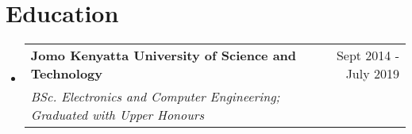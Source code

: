 \documentclass[letterpaper,11pt]{article}
\makeatletter
\newcommand{\resumeSubheading}[4]{
  \vspace{-1pt}\item
    \begin{tabular*}{0.97\textwidth}{l@{\extracolsep{\fill}}r}
      \textbf{#1} & #2 \\
      \textit{\small#3} & \textit{\small #4} \\
    \end{tabular*}\vspace{-5pt}
}
\newcommand{\resumeSubHeadingListStart}{\begin{itemize}[leftmargin=*]}
\newcommand{\resumeSubHeadingListEnd}{\end{itemize}}
\makeatother
\begin{document}
\section{Education}
  \resumeSubHeadingListStart
    \resumeSubheading
      {Jomo Kenyatta University of Science and Technology}{Sept 2014 - July 2019}
      {BSc. Electronics and Computer Engineering; Graduated with Upper Honours}
      \
  \resumeSubHeadingListEnd

%


\end{document}
